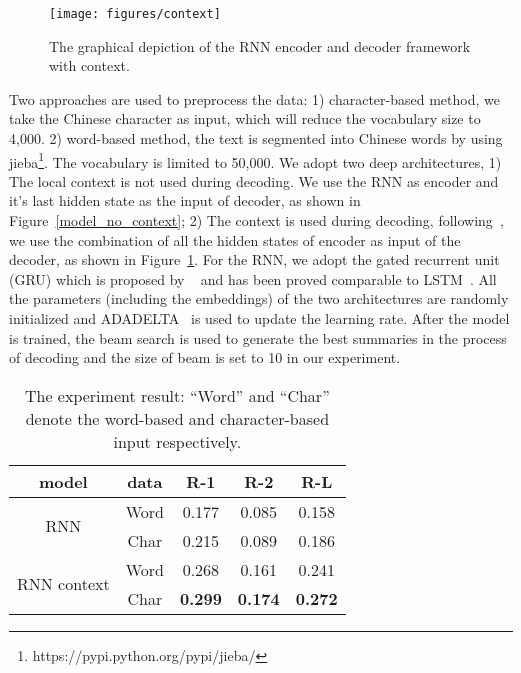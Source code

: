 \documentclass[11pt,a4paper]{article}
\begin{document}
\begin{figure}[!tb]
\centering
\texttt{[image: figures/context]}
\vspace{-25pt}
\caption{The graphical depiction of the RNN encoder and decoder framework with context. }
\label{model_context}
\vspace{-5pt}
\end{figure}

Two approaches are used to preprocess the data: 1) character-based method, we take the Chinese character as input, which will reduce the vocabulary size to 4,000. 2) word-based method, the text is segmented into Chinese words by using jieba\footnote{https://pypi.python.org/pypi/jieba/}. The vocabulary is limited to 50,000. We adopt two deep architectures, 1) The local context is not used during decoding. We use the RNN  as encoder and it's last hidden state as the input of decoder, as shown in Figure~\ref{model_no_context}; 2) The context is used during decoding, following~\cite{groundhog}, we use the combination of all the hidden states of encoder as input of the decoder, as shown in Figure~\ref{model_context}.  For the RNN, we adopt the gated recurrent unit (GRU) which is proposed by ~\cite{gatedRNN} and has been proved comparable to LSTM~\cite{lstm_vs_gru}. All the parameters (including the embeddings) of the two architectures are randomly initialized and ADADELTA~\cite{adadelta} is used to update the learning rate.  After the model is trained, the beam search is used to generate the best summaries in the process of decoding and the size of beam is set to 10 in our experiment.

\begin{table}[!h]
\begin{center}
\begin{tabular}{|c|c|c|c|c|}
\hline
model & data& R-1 & R-2 & R-L \\
\hline
\multirow{2}{*}{RNN} & Word& 0.177 &0.085 &0.158 \\
 \cline{2-5}
  & Char& 0.215 & 0.089 & 0.186  \\
\hline

 \multirow{2}{*}{RNN context} & Word& 0.268 & 0.161 &0.241\\
 \cline{2-5}
  & Char& \textbf{0.299} &\textbf{0.174} & \textbf{0.272}  \\
  \hline

 \end{tabular}
\end{center}
\caption{The experiment result: ``Word'' and  ``Char'' denote the word-based and  character-based input respectively.}
\label{eval}
\vspace{-10pt}
\end{table}
\end{document}
